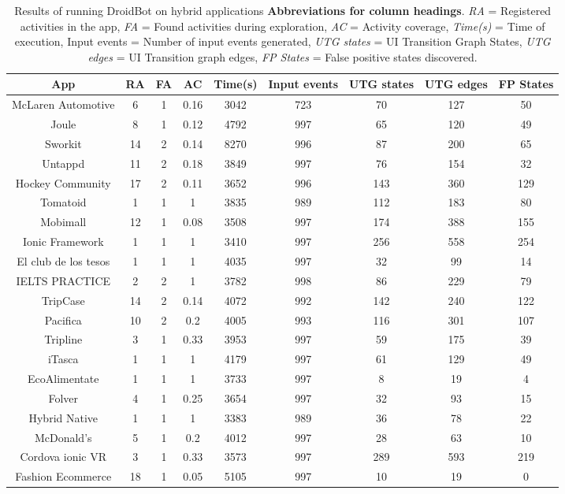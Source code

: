 \begin{table}[h]
	\centering
	\caption{Results of running DroidBot  on hybrid applications  \textbf{Abbreviations for column headings}. \textit{RA} = Registered activities in the app, \textit{FA} = Found activities during exploration, \textit{AC} = Activity coverage, \textit{Time(s)} = Time of execution, Input events = Number of input events generated, \textit{UTG states} = UI Transition Graph States, \textit{UTG edges} = UI Transition graph edges, \textit{FP States} = False positive states discovered.}
	\label{DroidHybrid}
	\begin{adjustbox}{width=\textwidth}
		\begin{tabular}{|c|c|c|c|c|c|c|c|c|}
			\hline
			\textbf{App} & \textbf{RA} & \textbf{FA} & \textbf{AC} & \textbf{Time(s)} & \textbf{Input events} & \textbf{UTG states} & \textbf{UTG edges} & \textbf{FP States}\\\hline
			McLaren Automotive & 6 & 1 & 0.16 & 3042 & 723 & 70 & 127 & 50 \\\hline
			Joule & 8 & 1 & 0.12 & 4792 & 997 & 65 & 120 & 49 \\\hline
			Sworkit & 14 & 2 & 0.14 & 8270 & 996 & 87 & 200 & 65 \\\hline
			Untappd & 11 & 2 & 0.18 & 3849 & 997 & 76 & 154 & 32 \\\hline
			Hockey Community & 17 & 2 & 0.11 & 3652 & 996 & 143 & 360 & 129 \\\hline
			Tomatoid & 1 & 1 & 1 & 3835 & 989 & 112 & 183 & 80 \\\hline
			Mobimall & 12 & 1 & 0.08 & 3508 & 997 & 174 & 388 & 155\\\hline
			Ionic Framework & 1 & 1 & 1 & 3410 & 997 & 256 & 558 & 254\\\hline
			El club de los tesos & 1 & 1 & 1 & 4035 & 997 & 32 & 99 & 14\\\hline
			IELTS PRACTICE & 2 & 2 & 1 & 3782 & 998 & 86 & 229 & 79\\\hline
			TripCase & 14 & 2 & 0.14 & 4072 & 992 & 142 & 240 & 122\\\hline
			Pacifica & 10 & 2 & 0.2 & 4005 & 993 & 116 & 301 & 107\\\hline
			Tripline & 3 & 1 & 0.33 & 3953 & 997 & 59 & 175 & 39\\\hline
			iTasca & 1 & 1 & 1 & 4179 & 997 & 61 & 129 & 49\\\hline
			EcoAlimentate & 1 & 1 & 1 & 3733 & 997 & 8 & 19 & 4\\\hline
			Folver & 4 & 1 & 0.25 & 3654 & 997 & 32 & 93 & 15\\\hline
			Hybrid Native & 1 & 1 & 1 & 3383 & 989 & 36 & 78 & 22\\\hline
			McDonald's & 5 & 1 & 0.2 & 4012 & 997 & 28 & 63 & 10\\\hline
			Cordova ionic VR & 3 & 1 & 0.33 & 3573 & 997 & 289 & 593 & 219\\\hline
			Fashion Ecommerce & 18 & 1 & 0.05 & 5105 & 997 & 10 & 19 & 0\\\hline
		\end{tabular}
	\end{adjustbox}
\end{table}

